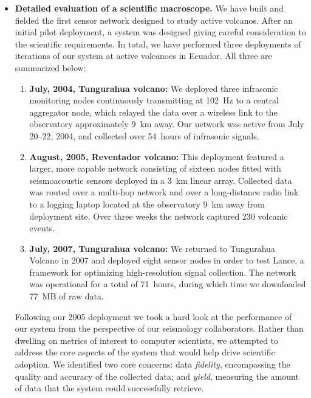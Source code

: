 \begin{itemize}

\item \textbf{Detailed evaluation of a scientific macroscope.} We have built
and fielded the first sensor network designed to study active volcanos. After
an initial pilot deployment, a system was designed giving careful
consideration to the scientific requirements. In total, we have performed
three deployments of iterations of our system at active volcanoes in Ecuador.
All three are summarized below:

\begin{enumerate}

\item \textbf{July, 2004, Tungurahua volcano:} We deployed three infrasonic
monitoring nodes continuously transmitting at 102~Hz to a central aggregator
node, which relayed the data over a wireless link to the observatory
approximately 9~km away. Our network was active from July 20--22, 2004, and
collected over 54~hours of infrasonic signals.

\item \textbf{August, 2005, Reventador volcano:} This deployment featured a
larger, more capable network consisting of sixteen nodes fitted with
seismoacoustic sensors deployed in a 3~km linear array. Collected data was
routed over a multi-hop network and over a long-distance radio link to a
logging laptop located at the observatory 9~km away from deployment site.
Over three weeks the network captured 230 volcanic events.

\item \textbf{July, 2007, Tungurahua volcano:} We returned to Tungurahua
Volcano in 2007 and deployed eight sensor nodes in order to test Lance, a
framework for optimizing high-resolution signal collection. The network was
operational for a total of 71~hours, during which time we downloaded 77~MB of
raw data.

\end{enumerate}

Following our 2005 deployment we took a hard look at the performance of our
system from the perspective of our seismology collaborators. Rather than
dwelling on metrics of interest to computer scientists, we attempted to
address the core aspects of the system that would help drive scientific
adoption. We identified two core concerns: data \textit{fidelity},
encompassing the quality and accuracy of the collected data; and
\textit{yield}, measuring the amount of data that the system could
successfully retrieve.


\end{itemize}
